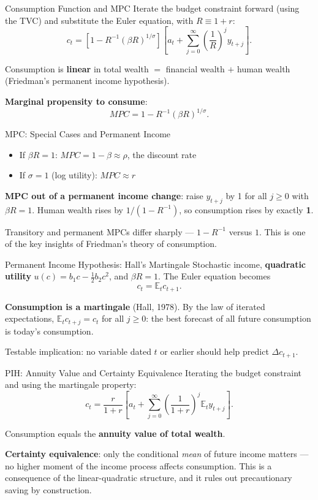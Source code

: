 \documentclass[blue]{beamer}
\newcommand{\E}{\mathbb{E}}
\begin{document}
	\begin{frame}{Consumption Function and MPC}
		Iterate the budget constraint forward (using the TVC) and substitute the Euler equation, with $R \equiv 1+r$:
		\[
		c_t = \left[1 - R^{-1}(\beta R)^{1/\sigma}\right]\left[a_t + \sum_{j=0}^{\infty}\left(\frac{1}{R}\right)^j y_{t+j}\right].
		\]
		
		Consumption is \textbf{linear} in total wealth $=$ financial wealth $+$ human wealth (Friedman's permanent income hypothesis).
		
		\bigskip
		\textbf{Marginal propensity to consume}:
		\[
		MPC = 1 - R^{-1}(\beta R)^{1/\sigma}.
		\]
	\end{frame}
	
	\begin{frame}{MPC: Special Cases and Permanent Income}
		\begin{itemize}
			\item If $\beta R = 1$: $MPC = 1 - \beta \approx \rho$, the discount rate
			\item If $\sigma = 1$ (log utility): $MPC \approx r$
		\end{itemize}
		
		\bigskip
		\textbf{MPC out of a permanent income change}: raise $y_{t+j}$ by 1 for all $j \geq 0$ with $\beta R = 1$. Human wealth rises by $1/(1-R^{-1})$, so consumption rises by exactly \textbf{1}.
		
		\bigskip
		Transitory and permanent MPCs differ sharply --- $1 - R^{-1}$ versus $1$. This is one of the key insights of Friedman's theory of consumption.
	\end{frame}
	
	\begin{frame}{Permanent Income Hypothesis: Hall's Martingale}
		Stochastic income, \textbf{quadratic utility} $u(c) = b_1 c - \frac{1}{2}b_2 c^2$, and $\beta R = 1$. The Euler equation becomes
		\[
		c_t = \E_t c_{t+1}.
		\]
		
		\textbf{Consumption is a martingale} (Hall, 1978). By the law of iterated expectations, $\E_t c_{t+j} = c_t$ for all $j \geq 0$: the best forecast of all future consumption is today's consumption.
		
		\bigskip
		Testable implication: no variable dated $t$ or earlier should help predict $\Delta c_{t+1}$.
	\end{frame}
	
	\begin{frame}{PIH: Annuity Value and Certainty Equivalence}
		Iterating the budget constraint and using the martingale property:
		\[
		c_t = \frac{r}{1+r}\left[a_t + \sum_{j=0}^{\infty}\left(\frac{1}{1+r}\right)^j \E_t y_{t+j}\right].
		\]
		
		Consumption equals the \textbf{annuity value of total wealth}.
		
		\bigskip
		\textbf{Certainty equivalence}: only the conditional \emph{mean} of future income matters --- no higher moment of the income process affects consumption. This is a consequence of the linear-quadratic structure, and it rules out precautionary saving by construction.
	\end{frame}
	
\end{document}

